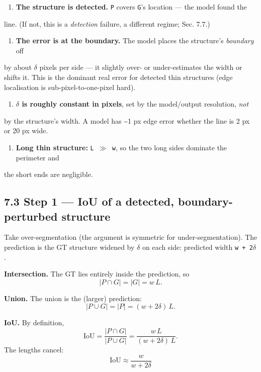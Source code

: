 \documentclass[11pt]{article}
\begin{document}
\begin{enumerate}\setlength{\itemsep}{1pt}
\item \textbf{The structure is detected.} \texttt{P} covers \texttt{G}'s location --- the model found the
\end{enumerate}
   line. (If not, this is a \textit{detection} failure, a different regime; Sec. 7.7.)
\begin{enumerate}\setlength{\itemsep}{1pt}
\item \textbf{The error is at the boundary.} The model places the structure's \textit{boundary} off
\end{enumerate}
   by about \texttt{$\delta$} pixels per side --- it slightly over- or under-estimates the width or    shifts it. This is the dominant real error for detected thin structures (edge    localisation is sub-pixel-to-one-pixel hard).
\begin{enumerate}\setlength{\itemsep}{1pt}
\item \textbf{\texttt{$\delta$} is roughly constant in pixels}, set by the model/output resolution, \textit{not}
\end{enumerate}
   by the structure's width. A model has \textasciitilde{}1 px edge error whether the line is 2 px or    20 px wide.
\begin{enumerate}\setlength{\itemsep}{1pt}
\item \textbf{Long thin structure:} \texttt{L $\gg$ w}, so the two long sides dominate the perimeter and
\end{enumerate}
   the short ends are negligible.

\subsection*{7.3 Step 1 --- IoU of a detected, boundary-perturbed structure}

Take over-segmentation (the argument is symmetric for under-segmentation). The prediction is the GT structure widened by \texttt{$\delta$} on each side: predicted width \texttt{w + 2$\delta$}.

\textbf{Intersection.} The GT lies entirely inside the prediction, so \[|P\cap G| = |G| = w\,L.\]

\textbf{Union.} The union is the (larger) prediction: \[|P\cup G| = |P| = (w+2\delta)\,L.\]

\textbf{IoU.} By definition, \[\text{IoU} = \frac{|P\cap G|}{|P\cup G|} = \frac{w\,L}{(w+2\delta)\,L}.\] The lengths cancel: \[\boxed{\;\text{IoU} \approx \dfrac{w}{w+2\delta}\;}\]
\end{document}
